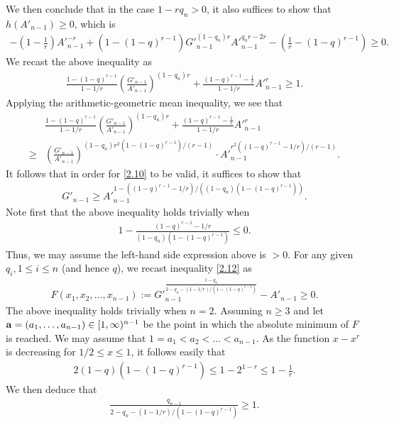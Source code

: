 \documentclass[11pt]{amsart}
\numberwithin{equation}{section}
\theoremstyle{definition}
\theoremstyle{remark}
\begin{document}
  We then conclude that in the case $1-rq_n>0$, it also suffices to show that $h(A'_{n-1}) \geq 0$, which is
\begin{align*}
  -(1-\frac {1}{r}){A'}^{-r}_{n-1}+(1-(1-q)^{r-1}){G'}^{(1-	q_n)r}_{n-1}{A'}^{q_nr-2r}_{n-1}  -(\frac 1r-(1-q)^{r-1}) \geq 0.
\end{align*}
   We recast the above inequality as
\begin{align}
\label{2.10}
 \frac {1-(1-q)^{r-1}}{1-1/r} \left (\frac {G'_{n-1}}{A'_{n-1}} \right )^{(1-	q_n)r} +\frac {(1-q)^{r-1}-\frac 1r}{1-1/r}{A'}^{r}_{n-1} \geq 1.
\end{align}
   Applying the arithmetic-geometric mean inequality, we see that
\begin{align*}
& \frac {1-(1-q)^{r-1}}{1-1/r} \left (\frac {G'_{n-1}}{A'_{n-1}} \right )^{(1-	q_n)r} +\frac {(1-q)^{r-1}-\frac 1r}{1-1/r}{A'}^{r}_{n-1} \\
\geq &  \left (\frac {G'_{n-1}}{A'_{n-1}} \right )^{(1-q_n)r^2(1-(1-q)^{r-1})/(r-1)}\cdot {A'}^{r^2((1-q)^{r-1}-1/r)/(r-1)}_{n-1}.
\end{align*}
   It follows that in order for \eqref{2.10} to be valid, it suffices to show that
\begin{align}
\label{2.12}
   G'_{n-1} \geq  {A'}^{1-((1-q)^{r-1}-1/r)/((1-q_n)(1-(1-q)^{r-1}))}_{n-1}.
\end{align}
   Note first that the above inequality holds trivially when
\begin{align*}
  1-\frac {(1-q)^{r-1}-1/r}{(1-q_n)(1-(1-q)^{r-1})} \leq 0.
\end{align*}
   Thus, we may assume the left-hand side expression above is $>0$. For any given $q_i, 1 \leq i \leq n$ (and hence $q$), we recast inequality \eqref{2.12} as
\begin{align}
\label{2.14}
   F(x_1, x_2, \ldots, x_{n-1}):={G'}^{\frac {1-q_n}{2-q_n-(1-1/r)/(1-(1-q)^{r-1})}}_{n-1} -  A'_{n-1} \geq 0.
\end{align}
   The above inequality holds trivially when $n=2$. Assuming $n \geq 3$ and let ${\bf a}=(a_1, \ldots,
    a_{n-1}) \in [1, \infty)^{n-1}$ be the point in which the absolute
    minimum of $F$ is reached. We may assume that $1=a_1 < a_2<\ldots < a_{n-1}$. As the function $x-x^r$ is decreasing for $1/2 \leq x \leq 1$, it follows easily that
\begin{align*}
   2(1-q)(1-(1-q)^{r-1}) \leq 1-2^{1-r} \leq 1-\frac 1r.
\end{align*}
  We then deduce that
\begin{align}
\label{2.16}
  \frac {q_{n-1}}{2-q_n-(1-1/r)/(1-(1-q)^{r-1})} \geq 1.
\end{align}
\end{document}
